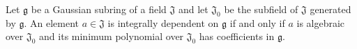 Let $\mathfrak{g}$ be a Gaussian subring of a field $\mathfrak{J}$ and let $\mathfrak{J}_0$ be the subfield of $\mathfrak{J}$ generated by $\mathfrak{g}$. An element $a \in \mathfrak{J}$ is integrally dependent on $\mathfrak{g}$ if and only if $a$ is algebraic over $\mathfrak{J}_0$ and its minimum polynomial over $\mathfrak{J}_0$ has coefficients in $\mathfrak{g}$.
